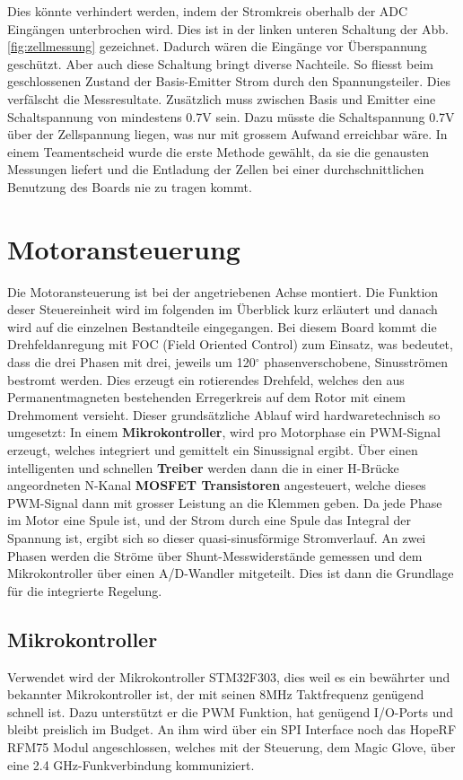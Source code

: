 Dies könnte verhindert werden, indem der Stromkreis oberhalb der ADC Eingängen unterbrochen wird. Dies ist in der linken unteren Schaltung der Abb.\ref{fig:zellmessung} gezeichnet. Dadurch wären die Eingänge vor Überspannung geschützt. Aber auch diese Schaltung bringt diverse Nachteile. So fliesst beim geschlossenen Zustand der Basis-Emitter Strom durch den Spannungsteiler. Dies verfälscht die Messresultate. Zusätzlich muss zwischen Basis und Emitter eine Schaltspannung von mindestens 0.7V sein. Dazu müsste die Schaltspannung 0.7V über der Zellspannung liegen, was nur mit grossem Aufwand erreichbar wäre. 
In einem Teamentscheid wurde die erste Methode gewählt, da sie die genausten Messungen liefert und die Entladung der Zellen bei einer durchschnittlichen Benutzung des Boards nie  zu tragen kommt.

\section{Motoransteuerung}
\label{HW_Motoransteuerung}
Die Motoransteuerung ist bei der angetriebenen Achse montiert. Die Funktion deser Steuereinheit wird im folgenden im Überblick kurz erläutert und danach wird auf die einzelnen Bestandteile eingegangen.
Bei diesem Board kommt die Drehfeldanregung mit FOC (Field Oriented Control) zum Einsatz, was bedeutet, dass die drei Phasen mit drei, jeweils um 120\(^\circ\) phasenverschobene, Sinusströmen bestromt werden. Dies erzeugt ein rotierendes Drehfeld, welches den aus Permanentmagneten bestehenden Erregerkreis auf dem Rotor mit einem Drehmoment versieht. Dieser grundsätzliche Ablauf wird hardwaretechnisch so umgesetzt:
In einem \textbf{Mikrokontroller}, wird pro Motorphase ein PWM-Signal erzeugt, welches integriert und gemittelt ein Sinussignal ergibt. Über einen intelligenten und schnellen \textbf{Treiber} werden dann die in einer H-Brücke angeordneten N-Kanal \textbf{MOSFET Transistoren} angesteuert, welche dieses PWM-Signal dann mit grosser Leistung an die Klemmen geben. Da jede Phase im Motor eine Spule ist, und der Strom durch eine Spule das Integral der Spannung ist, ergibt sich so dieser quasi-sinusförmige Stromverlauf.
An zwei Phasen werden die Ströme über Shunt-Messwiderstände gemessen und dem Mikrokontroller über einen A/D-Wandler mitgeteilt. Dies ist dann die Grundlage für die integrierte Regelung.

\subsection*{Mikrokontroller}
Verwendet wird der Mikrokontroller STM32F303, dies weil es ein bewährter und bekannter Mikrokontroller ist, der mit seinen 8MHz Taktfrequenz genügend schnell ist. Dazu unterstützt er die PWM Funktion, hat genügend I/O-Ports und bleibt preislich im Budget.
An ihm wird über ein SPI Interface noch das HopeRF RFM75 Modul angeschlossen, welches mit der Steuerung, dem Magic Glove, über eine 2.4 GHz-Funkverbindung kommuniziert.

